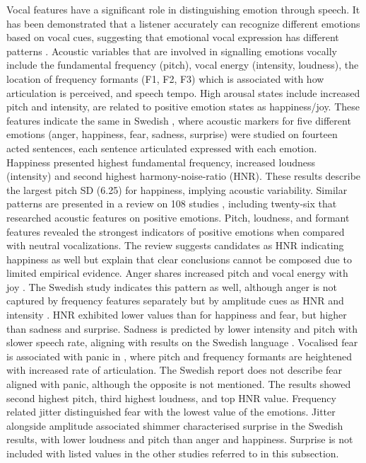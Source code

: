 Vocal features have a significant role in distinguishing emotion through speech. It has been demonstrated that a listener accurately can recognize different emotions based on vocal cues, suggesting that emotional vocal expression has different patterns \autocite{Banse1996}. Acoustic variables that are involved in signalling emotions vocally include the fundamental frequency (pitch), vocal energy (intensity, loudness), the location of frequency formants (F1, F2, F3) which is associated with how articulation is perceived, and speech tempo. 
High arousal states include increased pitch and intensity, are related to positive emotion states as happiness/joy. These features indicate the same in Swedish \autocite{Ekberg2023}, where acoustic markers for five different emotions (anger, happiness, fear, sadness, surprise) were studied on fourteen acted sentences, each sentence articulated expressed with each emotion. Happiness presented highest fundamental frequency, increased loudness (intensity) and second highest harmony-noise-ratio (HNR). These results describe the largest pitch SD (6.25) for happiness, implying acoustic variability. 
Similar patterns are presented in a review on 108 studies \autocite{Kamilolu2020}, including twenty-six that researched acoustic features on positive emotions. Pitch, loudness, and formant features revealed the strongest indicators of positive emotions when compared with neutral vocalizations. The review suggests candidates as HNR indicating happiness as well but explain that clear conclusions cannot be composed due to limited empirical evidence. 
Anger shares increased pitch and vocal energy with joy \autocite{Banse1996}. The Swedish study indicates this pattern as well, although anger is not captured by frequency features separately but by amplitude cues as HNR and intensity \autocite{Ekberg2023}. HNR exhibited lower values than for happiness and fear, but higher than sadness and surprise. 
Sadness is predicted by lower intensity and pitch with slower speech rate, aligning with results on the Swedish language \autocites{Ekberg2023}{Scherer2003}. 
Vocalised fear is associated with panic in \autocite{Banse1996}, where pitch and frequency formants are heightened with increased rate of articulation. The Swedish report does not describe fear aligned with panic, although the opposite is not mentioned. The results showed second highest pitch, third highest loudness, and top HNR value. Frequency related jitter distinguished fear with the lowest value of the emotions. 
Jitter alongside amplitude associated shimmer characterised surprise in the Swedish results, with lower loudness and pitch than anger and happiness. Surprise is not included with listed values in the other studies referred to in this subsection. 

